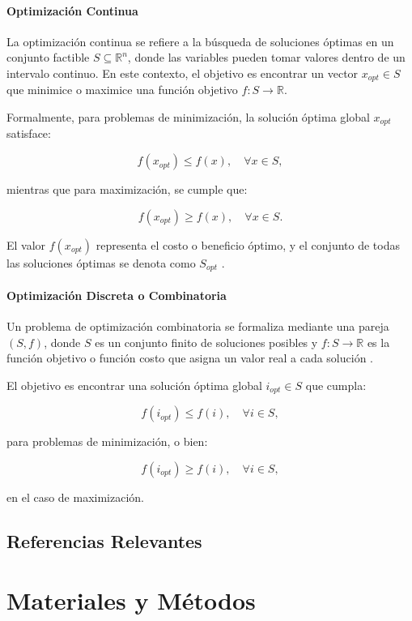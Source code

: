\documentclass[12pt,titlepage,twoside,openright]{book}
\begin{document}
\subsubsection{Optimización Continua}

La optimización continua se refiere a la búsqueda de soluciones óptimas en un conjunto factible \( S \subseteq \mathbb{R}^n \), donde las variables pueden tomar valores dentro de un intervalo continuo. En este contexto, el objetivo es encontrar un vector \( x_{opt} \in S \) que minimice o maximice una función objetivo \( f: S \to \mathbb{R} \).

Formalmente, para problemas de minimización, la solución óptima global \( x_{opt} \) satisface:

\[
f(x_{opt}) \leq f(x), \quad \forall x \in S,
\]

mientras que para maximización, se cumple que:

\[
f(x_{opt}) \geq f(x), \quad \forall x \in S.
\]

El valor \( f(x_{opt}) \) representa el costo o beneficio óptimo, y el conjunto de todas las soluciones óptimas se denota como \( S_{opt} \) \citep{cobos2010}.

\subsubsection{Optimización Discreta o Combinatoria}

Un problema de optimización combinatoria se formaliza mediante una pareja \((S, f)\), donde \(S\) es un conjunto finito de soluciones posibles y \(f: S \to \mathbb{R}\) es la función objetivo o función costo que asigna un valor real a cada solución \citep{cobos2010}.

El objetivo es encontrar una solución óptima global \(i_{opt} \in S\) que cumpla:

\[
f(i_{opt}) \leq f(i), \quad \forall i \in S,
\]

para problemas de minimización, o bien:

\[
f(i_{opt}) \geq f(i), \quad \forall i \in S,
\]

en el caso de maximización.


\section{Referencias Relevantes}

\chapter{Materiales y Métodos}
\label{cap:materialesymetodos}
\end{document}
